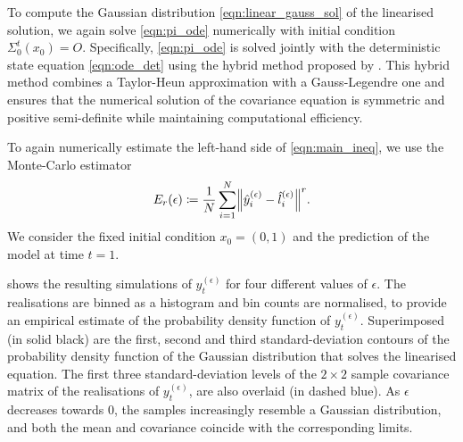 To compute the Gaussian distribution \eqref{eqn:linear_gauss_sol} of the linearised solution, we again solve \eqref{eqn:pi_ode} numerically with initial condition \(\Sigma_0^t\!\left(x_0\right) = O\).
Specifically, \eqref{eqn:pi_ode} is solved jointly with the deterministic state equation \eqref{eqn:ode_det} using the hybrid method proposed by \citet{Mazzoni_2008_ComputationalAspectsContinuous}.
This hybrid method combines a Taylor-Heun approximation with a Gauss-Legendre one and ensures that the numerical solution of the covariance equation is symmetric and positive semi-definite while maintaining computational efficiency.

To again numerically estimate the left-hand side of \eqref{eqn:main_ineq}, we use the Monte-Carlo estimator
\[
	E_r\!\left(\epsilon\right) \coloneqq \frac{1}{N}\sum_{i=1}^N{\norm{\hat{y}_i^{(\epsilon)} - \hat{l}_i^{(\epsilon)}}^r}.
\]
We consider the fixed initial condition \(x_0 = \left(0, 1\right)\) and the prediction of the model at time \(t = 1\).


 shows the resulting simulations of \(y_t^{(\epsilon)}\) for four different values of \(\epsilon\).
The realisations are binned as a histogram and bin counts are normalised, to provide an empirical estimate of the probability density function of \(y_t^{(\epsilon)}\).
Superimposed (in solid black) are the first, second and third standard-deviation contours of the probability density function of the Gaussian distribution that solves the linearised equation.
The first three standard-deviation levels of the \(2\times 2\) sample covariance matrix of the realisations of \(y_t^{(\epsilon)}\), are also overlaid (in dashed blue).
As \(\epsilon\) decreases towards \(0\), the samples increasingly resemble a Gaussian distribution, and both the mean and covariance coincide with the corresponding limits.

